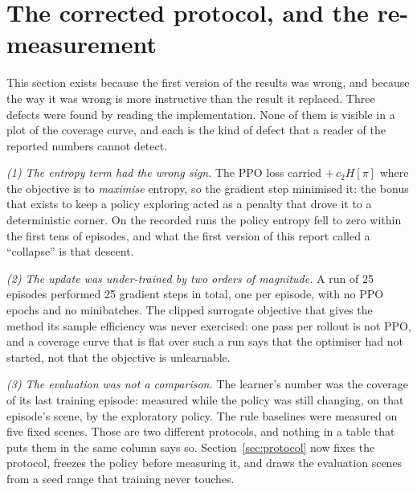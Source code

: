 
\section{The corrected protocol, and the re-measurement}
\label{sec:second_sprint}

This section exists because the first version of the results was wrong, and
because the way it was wrong is more instructive than the result it replaced.
Three defects were found by reading the implementation.  None of them is
visible in a plot of the coverage curve, and each is the kind of defect that a
reader of the reported numbers cannot detect.

\emph{(1) The entropy term had the wrong sign.}  The PPO loss carried
$+\,c_2 H[\pi]$ where the objective is to \emph{maximise} entropy, so the
gradient step minimised it: the bonus that exists to keep a policy exploring
acted as a penalty that drove it to a deterministic corner.  On the recorded
runs the policy entropy fell to zero within the first tens of episodes, and
what the first version of this report called a ``collapse'' is that descent.

\emph{(2) The update was under-trained by two orders of magnitude.}  A run of
25 episodes performed 25 gradient steps in total, one per episode, with no
PPO epochs and no minibatches.  The clipped surrogate objective that gives the
method its sample efficiency was never exercised: one pass per rollout is not
PPO, and a coverage curve that is flat over such a run says that the optimiser
had not started, not that the objective is unlearnable.

\emph{(3) The evaluation was not a comparison.}  The learner's number was the
coverage of its last training episode: measured while the policy was still
changing, on that episode's scene, by the exploratory policy.  The rule
baselines were measured on five fixed scenes.  Those are two different
protocols, and nothing in a table that puts them in the same column says so.
Section~\ref{sec:protocol} now fixes the protocol, freezes the policy before
measuring it, and draws the evaluation scenes from a seed range that training
never touches.

